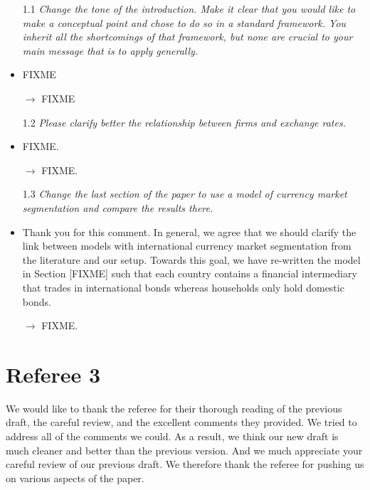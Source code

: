 \begin{itemize}
\item[1.1] \textit{Change the tone of the introduction. Make it clear
    that you would like to make a conceptual point and chose to do so
    in a standard framework. You inherit all the shortcomings of that
    framework, but none are crucial to your main message that is to
    apply generally.}

\item FIXME

\item[$\rightarrow $] FIXME


\item[1.2] \textit{Please clarify better the relationship between
    firms and exchange rates.}

\item FIXME.

\item[$\rightarrow $] FIXME.


\item[1.3] \textit{Change the last section of the paper to use a model
    of currency market segmentation and compare the results there.}

\item Thank you for this comment. In general, we agree that we should
  clarify the link between models with international currency market
  segmentation from the literature and our setup. Towards this goal, we
  have re-written the model in Section [FIXME] such that each country
  contains a financial intermediary that trades in international bonds
  whereas households only hold domestic bonds.

\item[$\rightarrow $] FIXME.

\end{itemize}


\newpage



\section*{Referee 3}
\noindent We would like to thank the referee for their thorough
reading of the previous draft, the careful review, and the excellent
comments they provided. We tried to address all of the comments we
could. As a result, we think our new draft is much cleaner and better
than the previous version. And we much appreciate your careful review
of our previous draft. We therefore thank the referee for pushing us
on various aspects of the paper.

